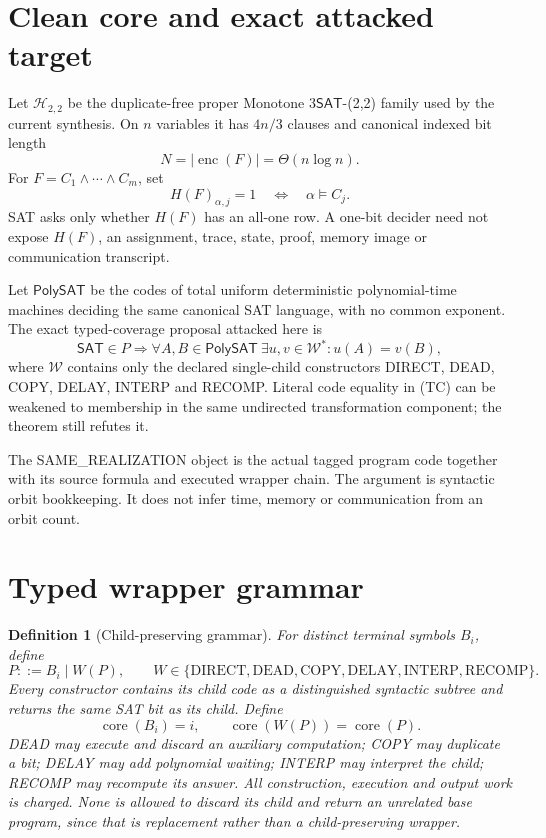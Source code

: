 \documentclass[11pt]{article}
\newtheorem{definition}{Definition}
\newcommand{\SAT}{\mathsf{SAT}}
\newcommand{\PolySAT}{\mathsf{PolySAT}}
\begin{document}
\section{Clean core and exact attacked target}
Let \(\mathcal H_{2,2}\) be the duplicate-free proper Monotone
\(3\SAT\)-(2,2) family used by the current synthesis.  On \(n\) variables it
has \(4n/3\) clauses and canonical indexed bit length
\[
 N=|\operatorname{enc}(F)|=\Theta(n\log n).
\]
For \(F=C_1\wedge\cdots\wedge C_m\), set
\[
 H(F)_{\alpha,j}=1\quad\Longleftrightarrow\quad \alpha\models C_j.
\]
SAT asks only whether \(H(F)\) has an all-one row.  A one-bit decider need
not expose \(H(F)\), an assignment, trace, state, proof, memory image or
communication transcript.

Let \(\PolySAT\) be the codes of total uniform deterministic polynomial-time
machines deciding the same canonical SAT language, with no common exponent.
The exact typed-coverage proposal attacked here is
\[
 \SAT\in P\Longrightarrow
 \forall A,B\in\PolySAT\ \exists u,v\in\mathcal W^*:
 u(A)=v(B),
 \tag{TC}
\]
where \(\mathcal W\) contains only the declared single-child constructors
DIRECT, DEAD, COPY, DELAY, INTERP and RECOMP.  Literal code equality in (TC)
can be weakened to membership in the same undirected transformation
component; the theorem still refutes it.

The SAME\_REALIZATION object is the actual tagged program code together with
its source formula and executed wrapper chain.  The argument is syntactic
orbit bookkeeping.  It does not infer time, memory or communication from an
orbit count.

\section{Typed wrapper grammar}
\begin{definition}[Child-preserving grammar]
For distinct terminal symbols \(B_i\), define
\[
 P::=B_i\mid W(P),\qquad
 W\in\{\mathrm{DIRECT},\mathrm{DEAD},\mathrm{COPY},
 \mathrm{DELAY},\mathrm{INTERP},\mathrm{RECOMP}\}.
\]
Every constructor contains its child code as a distinguished syntactic
subtree and returns the same SAT bit as its child.  Define
\[
 \operatorname{core}(B_i)=i,
 \qquad \operatorname{core}(W(P))=\operatorname{core}(P).
 \tag{1}
\]
DEAD may execute and discard an auxiliary computation; COPY may duplicate a
bit; DELAY may add polynomial waiting; INTERP may interpret the child; RECOMP
may recompute its answer.  All construction, execution and output work is
charged.  None is allowed to discard its child and return an unrelated base
program, since that is replacement rather than a child-preserving wrapper.
\end{definition}
\end{document}
